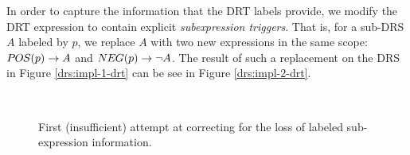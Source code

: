 In order to capture the information that the DRT labels provide, we modify the
DRT expression to contain explicit {\it subexpression triggers}.  That is, for a
sub-DRS $A$ labeled by $p$, we replace $A$ with two new expressions in the same
scope: $\POSPRED{p} \to A$ and $\NEGPRED{p} \to \lnot A$.  The result of such a
replacement on the DRS in Figure \ref{drs:impl-1-drt} can be see in Figure
\ref{drs:impl-2-drt}.   

\begin{figure}[t]
  \centering
  ~~~~~~~~~
  \caption{First (insufficient) attempt at correcting for the loss of labeled
  sub-expression information.}
  \label{drs:impl-2}
\end{figure}

